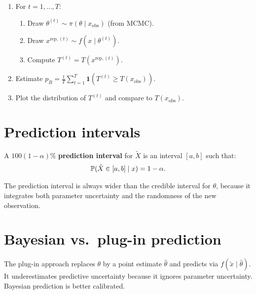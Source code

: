 \begin{algorithme}[title=\textbf{Posterior predictive check algorithm}]
\begin{enumerate}
  \item For $t = 1, \ldots, T$:
  \begin{enumerate}
    \item Draw $\theta^{(t)} \sim \pi(\theta \mid x_{\text{obs}})$ (from MCMC).
    \item Draw $x^{\text{rep},(t)} \sim f(x \mid \theta^{(t)})$.
    \item Compute $T^{(t)} = T(x^{\text{rep},(t)})$.
  \end{enumerate}
  \item Estimate $p_B = \frac{1}{T}\sum_{t=1}^T \mathbf{1}(T^{(t)} \geq T(x_{\text{obs}}))$.
  \item Plot the distribution of $T^{(t)}$ and compare to $T(x_{\text{obs}})$.
\end{enumerate}
\end{algorithme}

\section{Prediction intervals}

\begin{definition}
A $100(1-\alpha)\%$ \textbf{prediction interval} for $\tilde{X}$ is an
interval $[a, b]$ such that:
\[
  \mathbb{P}(\tilde{X} \in [a, b] \mid x) = 1 - \alpha.
\]
\end{definition}

\begin{remark}
The prediction interval is always wider than the credible interval for
$\theta$, because it integrates both parameter uncertainty and the
randomness of the new observation.
\end{remark}

\section{Bayesian vs.\ plug-in prediction}

\begin{warning}[title=\textbf{Plug-in danger}]
The plug-in approach replaces $\theta$ by a point estimate $\hat{\theta}$
and predicts via $f(\tilde{x} \mid \hat{\theta})$. It underestimates
predictive uncertainty because it ignores parameter uncertainty.
Bayesian prediction is better calibrated.
\end{warning}

